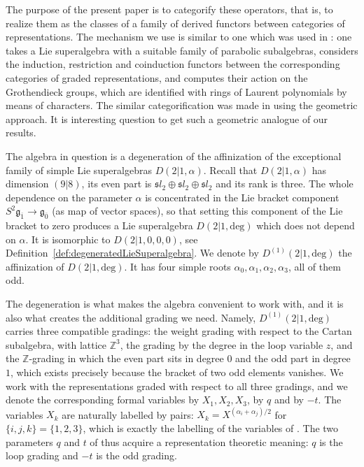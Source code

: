 \documentclass[10pt]{amsart}
\newcommand{\fg}{{\mathfrak g}}
\newcommand{\fsl}{{\mathfrak sl}}
\newcommand{\Ddeg}{D(2|1,\mathrm{deg})}
\newcommand{\Daff}{D^{(1)}(2|1,\mathrm{deg})}
\begin{document}
	The purpose of the present paper is to categorify these operators, that is, to realize them as the classes of a family of derived functors between categories of representations. The mechanism we use is similar to one which was used in \cite{KKhM}: one takes a Lie superalgebra with a suitable family of parabolic subalgebras, considers the induction, restriction and coinduction functors between the corresponding categories of graded representations, and computes their action on the Grothendieck groups, which are identified with rings of Laurent polynomials by means of characters. The similar categorification was made in \cite{bezrukavnikov2012affine} using the geometric approach. It is interesting question to get such a geometric analogue of our results.
	
	The algebra in question is a degeneration of the affinization of the exceptional family of simple Lie superalgebras $D(2|1,\alpha)$. Recall that $D(2|1,\alpha)$ has dimension $(9|8)$, its even part is $\fsl_2\oplus\fsl_2\oplus\fsl_2$ and its rank is three. The whole dependence on the parameter $\alpha$ is concentrated in the Lie bracket component $S^2\fg_{\overline 1}\rightarrow \fg_{\overline 0}$ (as map of vector spaces), so that setting this component of the Lie bracket to zero produces a Lie superalgebra $\Ddeg$ which does not depend on $\alpha$. It is isomorphic to $D(2|1,0,0,0)$, see Definition~\ref{def:degeneratedLieSuperalgebra}. We denote by $\Daff$ the affinization of $\Ddeg$. It has four simple roots $\alpha_0,\alpha_1,\alpha_2,\alpha_3$, all of them odd.
	
	The degeneration is what makes the algebra convenient to work with, and it is also what creates the additional grading we need. Namely, $\Daff$ carries three compatible gradings: the weight grading with respect to the Cartan subalgebra, with lattice $\mathbb{Z}^3$, the grading by the degree in the loop variable $z$, and the $\mathbb{Z}$-grading in which the even part sits in degree $0$ and the odd part in degree $1$, which exists precisely because the bracket of two odd elements vanishes. We work with the representations graded with respect to all three gradings, and we denote the corresponding formal variables by $X_1,X_2,X_3$, by $q$ and by $-t$. The variables $X_k$ are naturally labelled by pairs: $X_k=X^{(\alpha_i+\alpha_j)/2}$ for $\{i,j,k\}=\{1,2,3\}$, which is exactly the labelling of the variables of \cite{ArthamonovShakirov-2019}. The two parameters $q$ and $t$ of \cite{ArthamonovShakirov-2019} thus acquire a representation theoretic meaning: $q$ is the loop grading and $-t$ is the odd grading.
	
\end{document}
